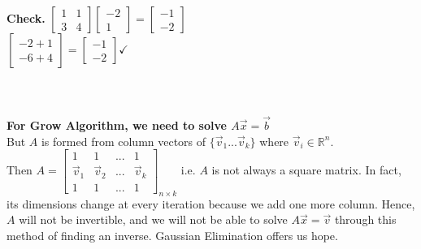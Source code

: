 \documentclass [12pt]{article}
\begin{document}
\noindent\textbf{Check. }$\begin{bmatrix}
1&1\\
3&4
\end{bmatrix}\begin{bmatrix}
-2\\
1
\end{bmatrix}=\begin{bmatrix}
-1\\
-2
\end{bmatrix}$\\
$\begin{bmatrix}
-2+1\\
-6+4
\end{bmatrix}=\begin{bmatrix}
-1\\
-2
\end{bmatrix} \checkmark$\\\\\\\\
\noindent\textbf{For Grow Algorithm, we need to solve $A\overrightarrow{x}=\overrightarrow{b}$}\\
But $A$ is formed from column vectors of $\{\overrightarrow{v}_1...\overrightarrow{v}_k\}$ where $\overrightarrow{v}_i\in\mathbb{R}^n$.\\
Then $A=\begin{bmatrix}
1&1&...&1\\
\overrightarrow{v}_1&\overrightarrow{v}_2&...&\overrightarrow{v}_k\\
1&1&...&1
\end{bmatrix}_{n\times k}$
i.e. $A$ is not always a square matrix. In fact, its dimensions change at every iteration because we add one more column. Hence, $A$ will not be invertible, and we will not be able to solve $A\overrightarrow{x}=\overrightarrow{v}$ through this method of finding an inverse. Gaussian Elimination offers us hope.
\end{document}
